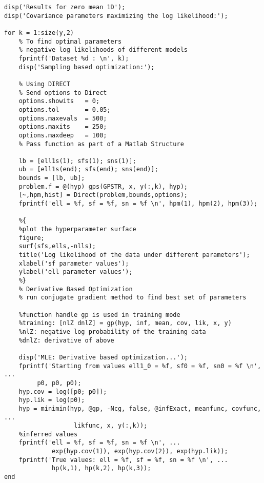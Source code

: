 \begin{verbatim}
disp('Results for zero mean 1D');
disp('Covariance parameters maximizing the log likelihood:');

for k = 1:size(y,2)
    % To find optimal parameters
    % negative log likelihoods of different models
    fprintf('Dataset %d : \n', k);
    disp('Sampling based optimization:');

    % Using DIRECT
    % Send options to Direct
    options.showits   = 0;
    options.tol       = 0.05;
    options.maxevals  = 500;
    options.maxits    = 250;
    options.maxdeep   = 100;
    % Pass function as part of a Matlab Structure

    lb = [ell1s(1); sfs(1); sns(1)];
    ub = [ell1s(end); sfs(end); sns(end)];
    bounds = [lb, ub];
    problem.f = @(hyp) gps(GPSTR, x, y(:,k), hyp);
    [~,hpm,hist] = Direct(problem,bounds,options);
    fprintf('ell = %f, sf = %f, sn = %f \n', hpm(1), hpm(2), hpm(3));

    %{
    %plot the hyperparameter surface
    figure;
    surf(sfs,ells,-nlls);
    title('Log likelihood of the data under different parameters');
    xlabel('sf parameter values');
    ylabel('ell parameter values');
    %}
    % Derivative Based Optimization
    % run conjugate gradient method to find best set of parameters

    %function handle gp is used in training mode
    %training: [nlZ dnlZ] = gp(hyp, inf, mean, cov, lik, x, y)
    %nlZ: negative log probability of the training data
    %dnlZ: derivative of above

    disp('MLE: Derivative based optimization...');
    fprintf('Starting from values ell1_0 = %f, sf0 = %f, sn0 = %f \n', ...
         p0, p0, p0);
    hyp.cov = log([p0; p0]);
    hyp.lik = log(p0);
    hyp = minimin(hyp, @gp, -Ncg, false, @infExact, meanfunc, covfunc, ...
                   likfunc, x, y(:,k));
    %inferred values
    fprintf('ell = %f, sf = %f, sn = %f \n', ...
             exp(hyp.cov(1)), exp(hyp.cov(2)), exp(hyp.lik));
    fprintf('True values: ell = %f, sf = %f, sn = %f \n', ...
             hp(k,1), hp(k,2), hp(k,3));
end
\end{verbatim}

